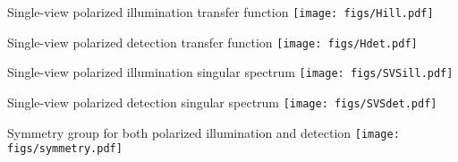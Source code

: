 \documentclass[presentation]{beamer}
\providecommand{\mb}[1]{\mathbf{#1}}
\providecommand{\ro}[1]{\mathbf{\mathbf{r}}_o}
\providecommand{\so}[1]{\mathbf{\hat{s}}_o}
\providecommand{\rd}[1]{\mathbf{r}_d}
\providecommand{\mbb}[1]{\mathbb{#1}}
\begin{document}

\begin{frame}[label=sec-1]{Single-view polarized illumination transfer function}
      \centering
      \texttt{[image: figs/Hill.pdf]}
    \end{frame}

\begin{frame}[label=sec-1]{Single-view polarized detection transfer function}
      \centering
      \texttt{[image: figs/Hdet.pdf]}
\end{frame}

\begin{frame}[label=sec-1]{Single-view polarized illumination singular spectrum}
      \centering
      \texttt{[image: figs/SVSill.pdf]}
    \end{frame}

\begin{frame}[label=sec-1]{Single-view polarized detection singular spectrum}
      \centering
      \texttt{[image: figs/SVSdet.pdf]}
\end{frame}

\begin{frame}[label=sec-1]{Symmetry group for both polarized illumination and detection}
      \centering
      \texttt{[image: figs/symmetry.pdf]}
\end{frame}
\end{document}
